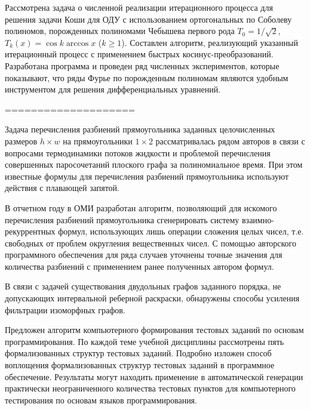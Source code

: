 Рассмотрена задача о численной реализации итерационного процесса для решения задачи Коши для ОДУ с использованием ортогональных по Соболеву полиномов, порожденных полиномами Чебышева первого рода $T_0=1/\sqrt{2}$, $T_k(x)=\cos k\arccos x$ ($k\ge1$). Составлен алгоритм, реализующий указанный итерационный процесс с применением быстрых косинус-преобразова\-ний. Разработана программа и проведен ряд численных экспериментов, которые показывают, что ряды Фурье по порожденным полиномам являются удобным инструментом для решения дифференциальных уравнений.





====================

Задача перечисления разбиений прямоугольника заданных целочисленных размеров $h\times w$ на прямоугольники $1\times 2$ рассматривалась рядом авторов в связи с вопросами термодинамики потоков жидкости и проблемой перечисления совершенных паросочетаний плоского графа за полиномиальное время.
При этом известные формулы для перечисления разбиений прямоугольника используют действия с плавающей запятой.


В отчетном году в ОМИ разработан алгоритм, позволяющий для искомого перечисления разбиений прямоугольника сгенерировать систему взаимно-рекуррентных формул, использующих лишь операции сложения целых чисел, т.е. свободных от проблем округления вещественных чисел.
С помощью авторского программного обеспечения для ряда случаев уточнены точные значения для количества разбиений с
применением ранее полученных автором формул.


В связи с задачей существования двудольных графов заданного порядка, не допускающих интервальной реберной раскраски,
обнаружены способы усиления фильтрации изоморфных графов.




Предложен алгоритм компьютерного формирования тестовых заданий по основам программирования.
По каждой теме учебной дисциплины рассмотрены пять формализованных структур тестовых заданий.
Подробно изложен способ воплощения формализованных структур тестовых заданий в программное обеспечение.
Результаты могут находить применение в автоматической генерации практически неограниченного количества тестовых пунктов для компьютерного тестирования по основам языков программирования.

